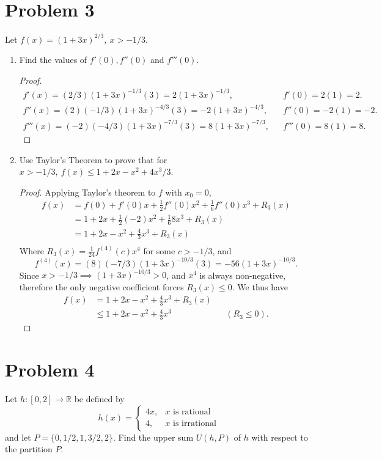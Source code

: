 \documentclass{article}
\theoremstyle{plain}
\newcommand{\R}{\mathbb{R}}
\begin{document}
\section*{Problem 3}
Let $f(x)=(1+3x)^{2/3},\ x>-1/3$.
\begin{enumerate}
\item Find the values of $f'(0),f''(0)$ and $f'''(0)$.
        \begin{proof}
          \begin{align*}
            f'(x)=(2/3)(1+3x)^{-1/3}(3)=2(1+3x)^{-1/3}, &&f'(0)=2(1)=2.\\
            f''(x)=(2)(-1/3)(1+3x)^{-4/3}(3)=-2(1+3x)^{-4/3}, &&f''(0)=-2(1)=-2.\\
            f'''(x)=(-2)(-4/3)(1+3x)^{-7/3}(3)=8(1+3x)^{-7/3}, &&f'''(0)=8(1)=8.
          \end{align*}
        \end{proof}

  \item Use Taylor's Theorem to prove that for $x>-1/3,\ f(x)\le1+2x-x^{2}+4x^{3}/3$.
        \begin{proof}
          Applying Taylor's theorem to $f$ with $x_{0}=0$,
          \begin{align*}
            f(x) &=f(0)+f'(0)x+\frac{1}{2}f''(0)x^{2}+\frac{1}{6}f''(0)x^{3}+R_{3}(x)\\
            &=1+2x+\frac{1}{2}(-2)x^{2}+\frac{1}{6}8x^{3}+R_{3}(x)\\
            &=1+2x-x^{2}+\frac{4}{3}x^{3}+R_{3}(x)\\
          \end{align*}
          Where $R_{3}(x)=\frac{1}{24}f^{(4)}(c)x^{4}$ for some $c>-1/3$, and
          \[f^{(4)}(x)=(8)(-7/3)(1+3x)^{-10/3}(3)=-56(1+3x)^{-10/3}. \]
          Since $x>-1/3\implies(1+3x)^{-10/3}>0$, and $x^{4}$ is always
          non-negative, therefore the only negative coefficient forces $R_{3}(x)\le0$. We thus have
          \begin{align*}
            f(x) &=1+2x-x^{2}+\frac{4}{3}x^{3}+R_{3}(x)\\
            &\le1+2x-x^{2}+\frac{4}{3}x^{3} && (R_{3}\le0).
          \end{align*}
        \end{proof}
\end{enumerate}

\section*{Problem 4}
Let $h:[0,2]\to\R$ be defined by
\[h(x)=\begin{cases}
    4x, & x\text{ is rational}\\
    4, & x\text{ is irrational}
  \end{cases}
\] and let $P=\{0,1/2,1,3/2,2\}$. Find the upper sum $U(h,P)$ of $h$ with
respect to the partition $P$.
\end{document}
